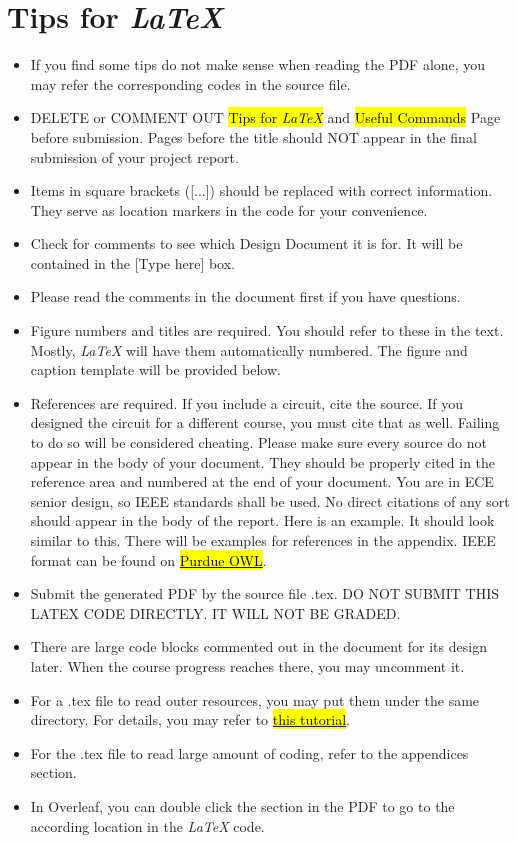 \documentclass[letterpaper, 11pt]{article}
\begin{document}
\section*{Tips for \textit{\LaTeX}}
\begin{itemize}
    \item If you find some tips do not make sense when reading the PDF alone, you may refer the corresponding codes in the source file. 
    \item DELETE or COMMENT OUT \hl{Tips for \textit{\LaTeX}} and \hl{Useful Commands} Page before submission. Pages before the title should NOT appear in the final submission of your project report. 
    \item Items in square brackets ([...]) should be replaced with correct information. They serve as location markers in the code for your convenience.
    \item Check for comments to see which Design Document it is for. It will be contained in the [Type here] box. 
    \item Please read the comments in the document first if you have questions. %
    \item Figure numbers and titles are required. You should refer to these in the text. Mostly, \textit{\LaTeX} will have them automatically numbered. The figure and caption template will be provided below. 
    \item References are required. If you include a circuit, cite the source. If you designed the circuit for a different course, you must cite that as well. Failing to do so will be considered cheating. Please make sure every source do not appear in the body of your document. They should be properly cited in the reference area and numbered at the end of your document. You are in ECE senior design, so IEEE standards shall be used. No direct citations of any sort should appear in the body of the report. Here is an example. \cite{b1} It should look similar to this. There will be examples for references in the appendix. IEEE format can be found on \href{https://owl.purdue.edu/owl/research_and_citation/ieee_style/ieee_overview.html}{\hl{Purdue OWL}}. 
    \item Submit the generated PDF by the source file .tex. DO NOT SUBMIT THIS LATEX CODE DIRECTLY. IT WILL NOT BE GRADED. 
    \item There are large code blocks commented out in the document for its design later. When the course progress reaches there, you may uncomment it. 
    \item For a .tex file to read outer resources, you may put them under the same directory. For details, you may refer to \href{https://www.overleaf.com/learn/latex/Inserting_Images}{\hl{this tutorial}}.
    \item For the .tex file to read large amount of coding, refer to the appendices section.
    \item In Overleaf, you can double click the section in the PDF to go to the according location in the \textit{\LaTeX} code. 
\end{itemize}
\end{document}
